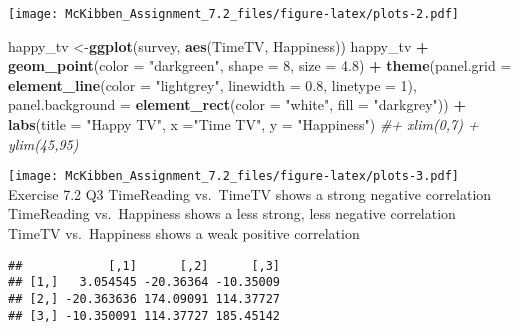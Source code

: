 \documentclass[
]{article}
\newenvironment{Shaded}{\begin{snugshade}}{\end{snugshade}}
\newcommand{\AttributeTok}[1]{\textcolor[rgb]{0.13,0.29,0.53}{#1}}
\newcommand{\CommentTok}[1]{\textcolor[rgb]{0.56,0.35,0.01}{\textit{#1}}}
\newcommand{\DecValTok}[1]{\textcolor[rgb]{0.00,0.00,0.81}{#1}}
\newcommand{\FloatTok}[1]{\textcolor[rgb]{0.00,0.00,0.81}{#1}}
\newcommand{\FunctionTok}[1]{\textcolor[rgb]{0.13,0.29,0.53}{\textbf{#1}}}
\newcommand{\NormalTok}[1]{#1}
\newcommand{\OtherTok}[1]{\textcolor[rgb]{0.56,0.35,0.01}{#1}}
\newcommand{\SpecialCharTok}[1]{\textcolor[rgb]{0.81,0.36,0.00}{\textbf{#1}}}
\newcommand{\StringTok}[1]{\textcolor[rgb]{0.31,0.60,0.02}{#1}}
\begin{document}
\texttt{[image: McKibben\_Assignment\_7.2\_files/figure-latex/plots-2.pdf]}

\begin{Shaded}
\begin{Highlighting}[]
\NormalTok{happy\_tv }\OtherTok{\textless{}{-}}\FunctionTok{ggplot}\NormalTok{(survey, }\FunctionTok{aes}\NormalTok{(TimeTV, Happiness))}
\NormalTok{happy\_tv }\SpecialCharTok{+} \FunctionTok{geom\_point}\NormalTok{(}\AttributeTok{color =} \StringTok{"darkgreen"}\NormalTok{, }\AttributeTok{shape =} \DecValTok{8}\NormalTok{, }\AttributeTok{size =} \FloatTok{4.8}\NormalTok{) }\SpecialCharTok{+} 
  \FunctionTok{theme}\NormalTok{(}\AttributeTok{panel.grid =} \FunctionTok{element\_line}\NormalTok{(}\AttributeTok{color =} \StringTok{"lightgrey"}\NormalTok{, }\AttributeTok{linewidth =} \FloatTok{0.8}\NormalTok{, }\AttributeTok{linetype =} \DecValTok{1}\NormalTok{), }
        \AttributeTok{panel.background =} \FunctionTok{element\_rect}\NormalTok{(}\AttributeTok{color =} \StringTok{"white"}\NormalTok{, }\AttributeTok{fill =} \StringTok{"darkgrey"}\NormalTok{)) }\SpecialCharTok{+}
  \FunctionTok{labs}\NormalTok{(}\AttributeTok{title =} \StringTok{"Happy TV"}\NormalTok{, }\AttributeTok{x =}\StringTok{"Time TV"}\NormalTok{, }
       \AttributeTok{y =} \StringTok{"Happiness"}\NormalTok{) }\CommentTok{\#+ xlim(0,7) + ylim(45,95)}
\end{Highlighting}
\end{Shaded}

\texttt{[image: McKibben\_Assignment\_7.2\_files/figure-latex/plots-3.pdf]}
Exercise 7.2 Q3 TimeReading vs.~TimeTV shows a strong negative
correlation TimeReading vs.~Happiness shows a less strong, less negative
correlation TimeTV vs.~Happiness shows a weak positive correlation

\begin{Shaded}
\end{Shaded}

\begin{verbatim}
##            [,1]      [,2]      [,3]
## [1,]   3.054545 -20.36364 -10.35009
## [2,] -20.363636 174.09091 114.37727
## [3,] -10.350091 114.37727 185.45142
\end{verbatim}
\end{document}
